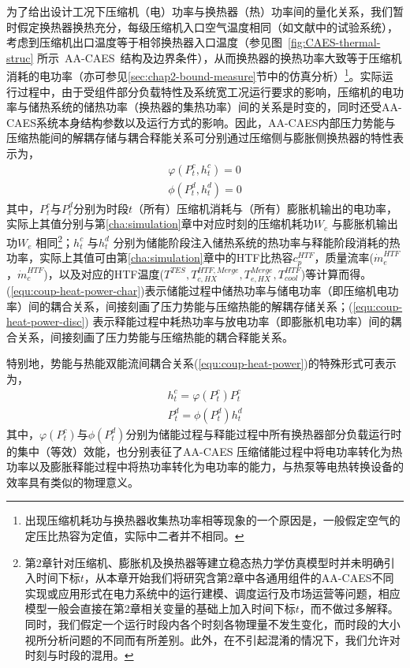 为了给出设计工况下压缩机（电）功率与换热器（热）功率间的量化关系，我们暂时假定换热器换热充分，每级压缩机入口空气温度相同（如文献中的试验系统），考虑到压缩机出口温度等于相邻换热器入口温度（参见图~\ref{fig:CAES-thermal-struc} 所示~AA-CAES~结构及边界条件），从而换热器的换热功率大致等于压缩机消耗的电功率（亦可参见\ref{sec:chap2-bound-measure}节中的仿真分析）\footnote{出现压缩机耗功与换热器收集热功率相等现象的一个原因是，一般假定空气的定压比热容为定值，实际中二者并不相同。}。实际运行过程中，由于受组件部分负载特性及系统宽工况运行要求的影响，压缩机的电功率与储热系统的储热功率（换热器的集热功率）间的关系是时变的，同时还受AA-CAES系统本身结构参数以及运行方式的影响。因此，AA-CAES内部压力势能与压缩热能间的解耦存储与耦合释能关系可分别通过压缩侧与膨胀侧换热器的特性表示为，
\begin{subequations}
\label{equ:coup-heat-power}
\begin{gather}
\varphi ({P_t^c,h_t^c}) = 0 \label{equ:coup-heat-power-char}\\
\phi ({P_t^d,h_t^d}) = 0 \label{equ:coup-heat-power-disc}
\end{gather}
\end{subequations}
其中，$P_t^c$与$P_t^d$分别为时段$t$（所有）压缩机消耗与（所有）膨胀机输出的电功率，实际上其值分别与第\ref{cha:simulation}章中对应时刻的压缩机耗功$W_{c}$ 与膨胀机输出功$W_{e}$ 相同\footnote{第2章针对压缩机、膨胀机及换热器等建立稳态热力学仿真模型时并未明确引入时间下标$t$，从本章开始我们将研究含第2章中各通用组件的AA-CAES不同实现或应用形式在电力系统中的运行建模、调度运行及市场运营等问题，相应模型一般会直接在第2章相关变量的基础上加入时间下标$t$，而不做过多解释。 同时，我们假定一个运行时段内各个时刻各物理量不发生变化，而时段的大小视所分析问题的不同而有所差别。此外，在不引起混淆的情况下，我们允许对时刻与时段的混用。}；$h_t^c$ 与$h_t^d$ 分别为储能阶段注入储热系统的热功率与释能阶段消耗的热功率，实际上其值可由第\ref{cha:simulation}章中的HTF比热容$c_p^{HTF}$，质量流率($\dot m_e^{HTF}$，$\dot m_c^{HTF}$)，以及对应的HTF温度($T^{TES}, T_{c,HX}^{HTF, Merge}, T_{e,HX}^{Merge},T_{cool}^{HTF}$)等计算而得。(\ref{equ:coup-heat-power-char})表示储能过程中储热功率与储电功率（即压缩机电功率）间的耦合关系，间接刻画了压力势能与压缩热能的解耦存储关系；(\ref{equ:coup-heat-power-disc}) 表示释能过程中耗热功率与放电功率（即膨胀机电功率）间的耦合关系，间接刻画了压力势能与压缩热能的耦合释能关系。

特别地，势能与热能双能流间耦合关系(\ref{equ:coup-heat-power})的特殊形式可表示为，
\begin{subequations}
\label{equ:coup-heat-power-spe}
\begin{gather}
h_t^c = \varphi ({P_t^c})P_t^c \label{equ:coup-heat-power-char-spe}\\
P_t^d = \phi ({P_t^d})h_t^d  \label{equ:coup-heat-power-disc-spe}
\end{gather}
\end{subequations}
其中，$\varphi ({P_t^c})$与$\phi ({P_t^d})$分别为储能过程与释能过程中所有换热器部分负载运行时的集中（等效）效能，也分别表征了AA-CAES 压缩储能过程中将电功率转化为热功率以及膨胀释能过程中将热功率转化为电功率的能力，与热泵等电热转换设备的效率具有类似的物理意义。

